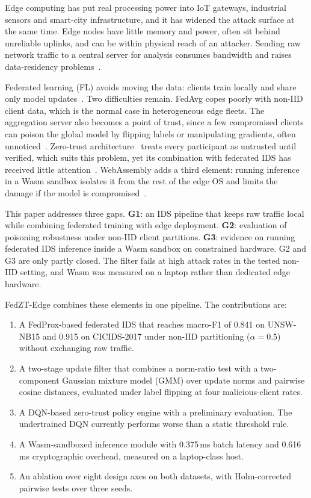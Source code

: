 \documentclass[iicol,Numbered]{sn-jnl}
\begin{document}
Edge computing has put real processing power into IoT gateways, industrial
sensors and smart-city infrastructure, and it has widened the attack surface at
the same time. Edge nodes have little memory and power, often sit behind
unreliable uplinks, and can be within physical reach of an attacker. Sending raw
network traffic to a central server for analysis consumes bandwidth and raises
data-residency problems~\cite{mcmahan2017,li2020federated}.

Federated learning (FL) avoids moving the data: clients train locally and share
only model updates~\cite{mcmahan2017}. Two difficulties remain. FedAvg copes
poorly with non-IID client data, which is the normal case in heterogeneous edge
fleets. The aggregation server also becomes a point of trust, since a few
compromised clients can poison the global model by flipping labels or
manipulating gradients, often unnoticed~\cite{tolpegin2020,bagdasaryan2020}.
Zero-trust architecture~\cite{nist2020} treats every participant as untrusted
until verified, which suits this problem, yet its combination with federated
IDS has received little attention~\cite{chen2021zero}. WebAssembly adds a third
element: running inference in a Wasm sandbox isolates it from the rest of the
edge OS and limits the damage if the model is compromised~\cite{haas2017wasm}.

This paper addresses three gaps. \textbf{G1}: an IDS pipeline that keeps raw
traffic local while combining federated training with edge deployment.
\textbf{G2}: evaluation of poisoning robustness under non-IID client
partitions. \textbf{G3}: evidence on running federated IDS inference inside a
Wasm sandbox on constrained hardware. G2 and G3 are only partly closed. The
filter fails at high attack rates in the tested non-IID setting, and Wasm was
measured on a laptop rather than dedicated edge hardware.

FedZT-Edge combines these elements in one pipeline. The contributions are:

\begin{enumerate}[leftmargin=*,itemsep=3pt]
\item A FedProx-based federated IDS that reaches macro-F1 of 0.841 on
      UNSW-NB15 and 0.915 on CICIDS-2017 under non-IID partitioning
      ($\alpha=0.5$) without exchanging raw traffic.
\item A two-stage update filter that combines a norm-ratio test with a
      two-component Gaussian mixture model (GMM) over update norms and pairwise
      cosine distances, evaluated under label flipping at four
      malicious-client rates.
\item A DQN-based zero-trust policy engine with a preliminary evaluation. The
      undertrained DQN currently performs worse than a static threshold rule.
\item A Wasm-sandboxed inference module with 0.375\,ms batch latency and
      0.616\,ms cryptographic overhead, measured on a laptop-class host.
\item An ablation over eight design axes on both datasets, with
      Holm-corrected pairwise tests over three seeds.
\end{enumerate}
\end{document}
